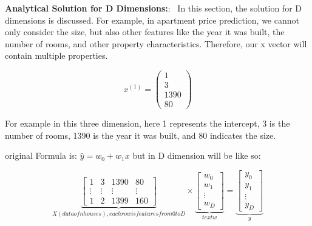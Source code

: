 \documentclass{article}
\renewcommand\text[1]{\textnormal{\textenglish{#1}}}
\newenvironment{cheatformula}[1][כותרת]{
    \begin{minipage}{\linewidth}
    \textbf{#1}:
}{
    \end{minipage}\\[0ex]
}
\begin{document}
\begin{multicols*}{2}
\begin{cheatformula}[Analytical Solution for D Dimensions:]\
In this section, the solution for D dimensions is discussed. For example, in apartment price prediction, we cannot only consider the size, but also other features like the year it was built, the number of rooms, and other property characteristics. Therefore, our x vector will contain multiple properties.

$$x ^{(1)}= \begin{pmatrix}
 1\\ 3 \\1390 \\80
\end{pmatrix}$$

For example in this three dimension, here 1 represents the intercept, 3 is the number of rooms, 1390 is the year it was built, and 80 indicates the size.

original Formula is: $  \widehat{y} = w_{0} + w_{1}x$  but in D dimension will be like so:



$$
\underbrace{ 
\begin{bmatrix}
 1 & 3 & 1390 & 80 \\
 \vdots & \vdots & \vdots & \vdots \\
 1 & 2 & 1399 & 160
\end{bmatrix} 
}_{X (data of n houses), each row is features from 0 to D} 
\times \underbrace{ 
\begin{bmatrix}
w_{0}  \\
w_{1}  \\
\vdots \\
w_{D} 
\end{bmatrix} 
}_{text{w}} =
\underbrace{ 
\begin{bmatrix}
y_{0}  \\
y_{1}  \\
\vdots \\
y_{D}
\end{bmatrix} 
}_{y}  
$$


\end{cheatformula}
\end{multicols*}
\end{document}
